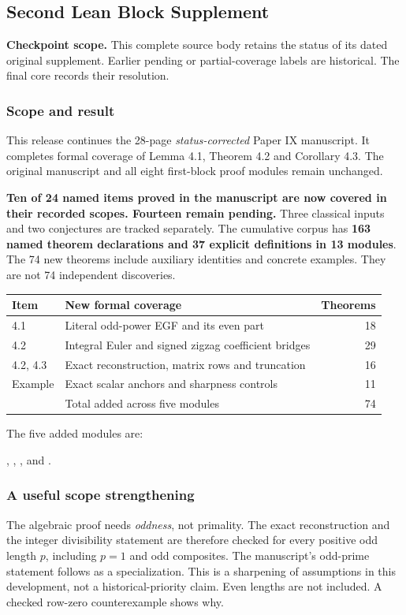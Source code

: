 \clearpage\subsection{Second Lean Block Supplement}\label{app:sup2}
\noindent\textbf{Checkpoint scope.} This complete source body retains the status of its dated original supplement. Earlier pending or partial-coverage labels are historical. The final core records their resolution.\par\medskip
\subsubsection*{Scope and result}
This release continues the 28-page \emph{status-corrected} Paper IX manuscript. It completes formal coverage of Lemma 4.1, Theorem 4.2 and Corollary 4.3. The original manuscript and all eight first-block proof modules remain unchanged.

\textbf{Ten of 24 named items proved in the manuscript are now covered in their recorded scopes. Fourteen remain pending.} Three classical inputs and two conjectures are tracked separately. The cumulative corpus has \textbf{163 named theorem declarations and 37 explicit definitions in 13 modules}. The 74 new theorems include auxiliary identities and concrete examples. They are not 74 independent discoveries.

\begin{center}
\begin{tabular}{@{}p{}p{}r@{}}
\toprule
Item & New formal coverage & Theorems\\\midrule
4.1 & Literal odd-power EGF and its even part & 18\\
4.2 & Integral Euler and signed zigzag coefficient bridges & 29\\
4.2, 4.3 & Exact reconstruction, matrix rows and truncation & 16\\
Example & Exact scalar anchors and sharpness controls & 11\\\midrule
 & Total added across five modules & 74\\\bottomrule
\end{tabular}
\end{center}
The five added modules are:\par
{\small{}, , ,\newline
{} and .}

\subsubsection*{A useful scope strengthening}
The algebraic proof needs \emph{oddness}, not primality. The exact reconstruction and the integer divisibility statement are therefore checked for every positive odd length $p$, including $p=1$ and odd composites. The manuscript's odd-prime statement follows as a specialization. This is a sharpening of assumptions in this development, not a historical-priority claim. Even lengths are not included. A checked row-zero counterexample shows why.

